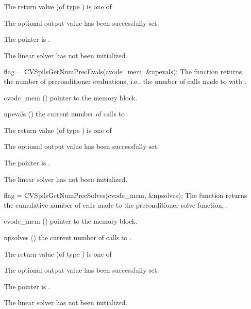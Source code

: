 {
  The return value  (of type ) is one of
  \begin{args}
  \item[\Id{CVSPILS\_SUCCESS}] 
    The optional output value has been successfully set.
  \item[\Id{CVSPILS\_MEM\_NULL}]
    The  pointer is .
  \item[\Id{CVSPILS\_LMEM\_NULL}]
    The {\cvspils} linear solver has not been initialized.
  \end{args}
}
{}
{
  flag = CVSpilsGetNumPrecEvals(cvode\_mem, \&npevals);
}
{
  The function  returns the
  number of preconditioner evaluations, i.e., the number of 
  calls made to  with .
}
{
  \begin{args}
  \item[cvode\_mem] ()
    pointer to the {\cvode} memory block.
  \item[npevals] ()
    the current number of calls to .
  \end{args}
}
{
  The return value  (of type ) is one of
  \begin{args}
  \item[\Id{CVSPILS\_SUCCESS}] 
    The optional output value has been successfully set.
  \item[\Id{CVSPILS\_MEM\_NULL}]
    The  pointer is .
  \item[\Id{CVSPILS\_LMEM\_NULL}]
    The {\cvspils} linear solver has not been initialized.
  \end{args}
}
{}
{
  flag = CVSpilsGetNumPrecSolves(cvode\_mem, \&npsolves);
}
{
  The function  returns the
  cumulative number of calls made to the preconditioner 
  solve function, .
}
{
  \begin{args}
  \item[cvode\_mem] ()
    pointer to the {\cvode} memory block.
  \item[npsolves] ()
    the current number of calls to .
  \end{args}
}
{
  The return value  (of type ) is one of
  \begin{args}
  \item[\Id{CVSPILS\_SUCCESS}] 
    The optional output value has been successfully set.
  \item[\Id{CVSPILS\_MEM\_NULL}]
    The  pointer is .
  \item[\Id{CVSPILS\_LMEM\_NULL}]
    The {\cvspils} linear solver has not been initialized.
  \end{args}
}
